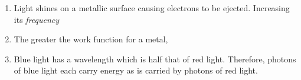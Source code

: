 \begin{enumerate}[itemsep=6pt]
\item Light shines on a metallic surface causing electrons to be ejected.
  Increasing its \emph{frequency}
  
\item The greater the work function for a metal,
  
\item Blue light has a wavelength which is half that of red light. Therefore,
  photons of blue light each carry \underline{\hspace{.8in}} energy as is
  carried by photons of red light.


\end{enumerate}
